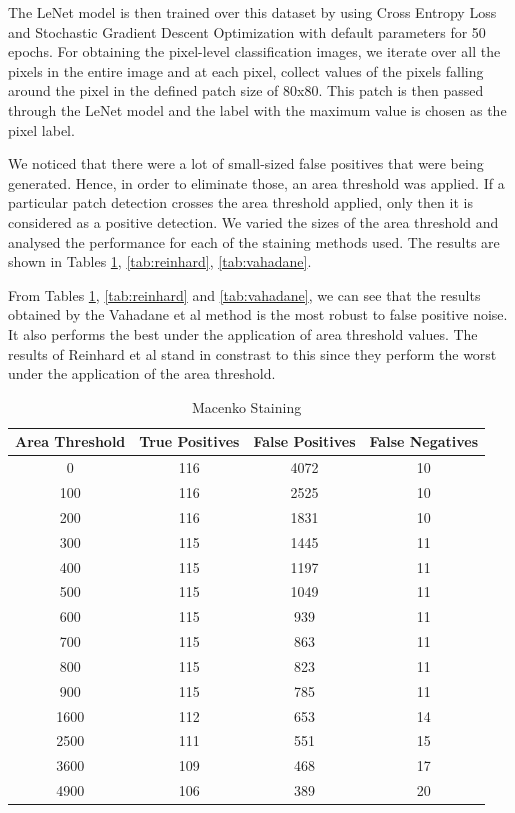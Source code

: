 \documentclass{nitk}
\begin{document}
The LeNet model is then trained over this dataset by using Cross Entropy Loss and Stochastic Gradient Descent Optimization with default parameters for 50 epochs. For obtaining the pixel-level classification images, we iterate over all the pixels in the entire image and at each pixel, collect values of the pixels falling around the pixel in the defined patch size of 80x80. This patch is then passed through the LeNet model and the label with the maximum value is chosen as the pixel label. \\ \par

We noticed that there were a lot of small-sized false positives that were being generated. Hence, in order to eliminate those, an area threshold was applied. If a particular patch detection crosses the area threshold applied, only then it is considered as a positive detection. We varied the sizes of the area threshold and analysed the performance for each of the staining methods used. The results are shown in Tables \ref{tab:macenko}, \ref{tab:reinhard}, \ref{tab:vahadane}. \\ \par

From Tables \ref{tab:macenko}, \ref{tab:reinhard} and \ref{tab:vahadane}, we can see that the results obtained by the Vahadane et al\cite{} method is the most robust to false positive noise. It also performs the best under the application of area threshold values. The results of Reinhard et al\cite{reinhard} stand in constrast to this since they perform the worst under the application of the area threshold. 

\begin{table}[]
    \centering
    \begin{tabular}{c|c|c|c}
         Area Threshold & True Positives & False Positives & False Negatives  \\
         \hline
         0 & 116 & 4072 & 10 \\
         100 & 116 & 2525 & 10 \\
         200 & 116 & 1831 & 10 \\
         300 & 115 & 1445 & 11 \\
         400 & 115 & 1197 & 11 \\
         500 & 115 & 1049 & 11 \\
         600 & 115 & 939 & 11 \\
         700 & 115 & 863 & 11 \\
         800 & 115 & 823 & 11 \\
         900 & 115 & 785 & 11 \\
         1600 & 112 & 653 & 14 \\
         2500 & 111 & 551 & 15 \\
         3600 & 109 & 468 & 17 \\
         4900 & 106 & 389 & 20
    \end{tabular}
    \caption{Macenko\cite{macenko2009method} Staining}
    \label{tab:macenko}
\end{table}
\end{document}
